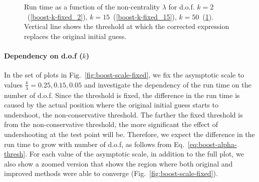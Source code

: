 \documentclass{amsart}
\numberwithin{equation}{section}
\begin{document}
\begin{figure}[h]
\begin{subfigure}[t]{0.3\textwidth}
		\caption{}\label{boost-k-fixed_50}
	\end{subfigure}
    \caption{Run time as a function of the non-centrality $\lambda$ for d.o.f. $k=2$~(\ref{boost-k-fixed_2}), $k=15$~(\ref{boost-k-fixed_15}), $k=50$~(\ref{boost-k-fixed_50}). Vertical line shows the threshold at which the corrected expression replaces the original initial guess.}\label{fig:boost-k-fixed}
\end{figure}
%
\paragraph{Dependency on d.o.f ($k$)} In the set of plots in Fig.~\ref{fig:boost-scale-fixed}, we fix the asymptotic scale to values $\frac{k}{\lambda} = 0.25, 0.15, 0.05$ and investigate the dependency of the run time on the number of d.o.f. Since the threshold is fixed, the difference in the run time is caused by the actual position where the original initial guess starts to undershoot, the non-conservative threshold. The farther the fixed threshold is from the non-conservative threshold, the more significant the effect of undershooting at the test point will be. Therefore, we expect the difference in the run time to grow with number of d.o.f, as follows from Eq.~\ref{eq:boost-alpha-thresh}. For each value of the asymptotic scale, in addition to the full plot, we also show a zoomed version that shows the region where both original and improved methods were able to converge (Fig.~\ref{fig:boost-scale-fixed}).
%
\end{document}
